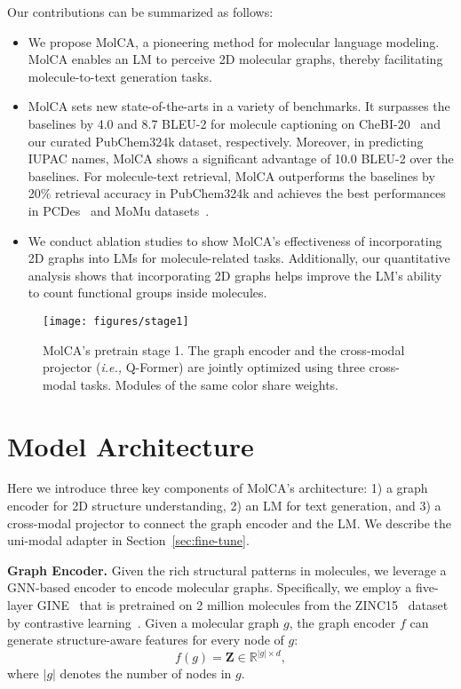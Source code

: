 \documentclass[11pt]{article}
\newcommand{\ie}{\emph{i.e., }}
\newcommand{\Mat}[1]{\textbf{#1}}
\begin{document}
Our contributions can be summarized as follows:
\begin{itemize}[leftmargin=*]
 \item We propose MolCA, a pioneering method for molecular language modeling. MolCA enables an LM to perceive 2D molecular graphs, thereby facilitating molecule-to-text generation tasks.
 \item MolCA sets new state-of-the-arts in a variety of benchmarks. It surpasses the baselines by 4.0 and 8.7 BLEU-2 for molecule captioning on CheBI-20~\cite{MolT5} and our curated PubChem324k dataset, respectively. Moreover, in predicting IUPAC names, MolCA shows a significant advantage of 10.0 BLEU-2 over the baselines. For molecule-text retrieval, MolCA outperforms the baselines by 20\% retrieval accuracy in PubChem324k and achieves the best performances in PCDes~\cite{KVPLM} and MoMu datasets~\cite{MoMu}. 
 \item We conduct ablation studies to show MolCA's effectiveness of incorporating 2D graphs into LMs for molecule-related tasks. Additionally, our quantitative analysis shows that incorporating 2D graphs helps improve the LM's ability to count functional groups inside molecules. 
\end{itemize}


\begin{figure*}[t]
 \centering
 \texttt{[image: figures/stage1]}
 \caption{MolCA's pretrain stage 1. The graph encoder and the cross-modal projector (\ie Q-Former) are jointly optimized using three cross-modal tasks. Modules of the same color share weights.}
 \label{fig:stage1}
 \vspace{-10pt}
\end{figure*}

 \vspace{-3mm}
\section{Model Architecture}

\vspace{-2mm}
Here we introduce three key components of MolCA's architecture: 1) a graph encoder for 2D structure understanding, 2) an LM for text generation, and 3) a cross-modal projector to connect the graph encoder and the LM. We describe the uni-modal adapter in Section~\ref{sec:fine-tune}.



\textbf{Graph Encoder.} Given the rich structural patterns in molecules, we leverage a GNN-based encoder to encode molecular graphs. Specifically, we employ a five-layer GINE~\citep{pretrain_gnn} that is pretrained on 2 million molecules from the ZINC15~\citep{ZINC15} dataset by contrastive learning~\citep{GraphCL}. Given a molecular graph $g$, the graph encoder $f$ can generate structure-aware features for every node of $g$: 
\begin{equation}
 f(g)=\Mat{Z}\in \mathbb{R}^{|g|\times d},
\end{equation}
where $|g|$ denotes the number of nodes in $g$.
\end{document}
